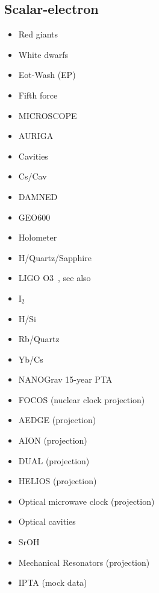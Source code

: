 \documentclass[8pt,twocolumn]{extarticle}
\begin{document}
\begin{mdframed}
\subsection*{Scalar-electron}\vspace{-0.5em}
\begin{itemize}\setlength\itemsep{-0.5em}
	\item Red giants~\cite{Hardy:2016kme}
	\item White dwarfs~\cite{Bottaro:2023gep}
	\item Eot-Wash (EP)~\cite{Hees:2018fpg}
	\item Fifth force~\cite{Adelberger:2003zx,Fischbach:1996eq,Fienga:2023ocw,Mars}
	\item MICROSCOPE~\cite{Berge:2017ovy}
	\item AURIGA~\cite{Branca:2016rez}
	\item Cavities~\cite{Filzinger:2023qqh}
	\item Cs/Cav~\cite{Tretiak:2022ndx}
	\item DAMNED~\cite{Savalle:2020vgz}
	\item GEO600~\cite{Vermeulen:2021epa}
	\item Holometer~\cite{Aiello:2021wlp}
	\item H/Quartz/Sapphire~\cite{Campbell:2020fvq}
	\item LIGO O3~\cite{Gottel:2024cfj}, see also~\cite{Fukusumi:2023kqd}
	\item I$_2$~\cite{Oswald:2021vtc}
	\item H/Si~\cite{Kennedy:2020bac}
	\item Rb/Quartz~\cite{Zhang:2022ewz}
	\item Yb/Cs~\cite{Kobayashi:2022vsf}
	\item NANOGrav 15-year PTA~\cite{NANOGrav:2023hvm}
	\item FOCOS (nuclear clock projection)~\cite{Brzeminski:2022sde}
	\item AEDGE (projection)~\cite{Badurina:2021rgt}
	\item AION (projection)~\cite{Badurina:2021rgt}
	\item DUAL (projection)~\cite{Arvanitaki:2015iga}
	\item HELIOS (projection)~\cite{Hirschel:2023sbx}
		\item Optical microwave clock (projection)~\cite{Arvanitaki:2014faa}
\item Optical cavities~\cite{Geraci:2018fax}
\item SrOH~\cite{SrOH}
		\item Mechanical Resonators (projection)~\cite{Manley:2019vxy}
			\item IPTA (mock data)~\cite{Kaplan:2022lmz}

\end{itemize}
\end{mdframed}
\end{document}
